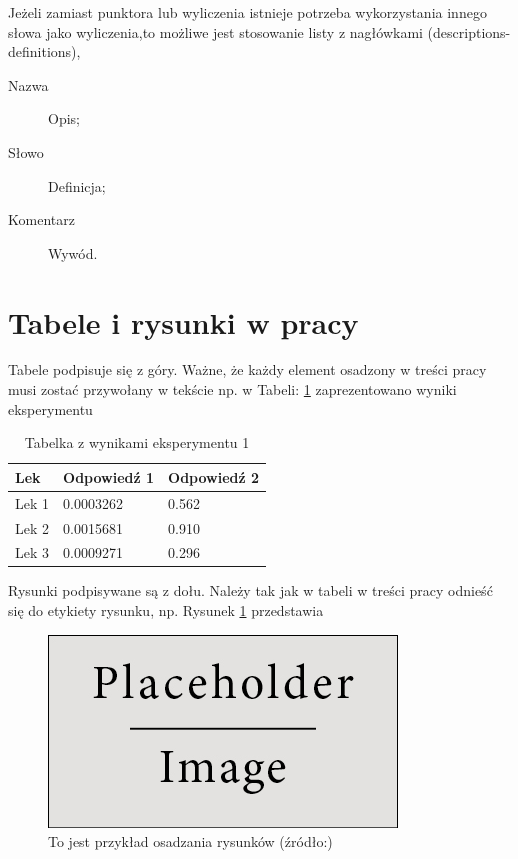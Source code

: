 Jeżeli zamiast punktora lub wyliczenia istnieje potrzeba wykorzystania innego słowa jako wyliczenia,to możliwe jest stosowanie listy z nagłówkami (descriptions-definitions),
\begin{description}
\item[Nazwa] Opis;
\item[Słowo] Definicja;
\item[Komentarz] Wywód.
\end{description}

\section{Tabele i rysunki w pracy}

Tabele podpisuje się z góry. Ważne, że każdy element osadzony w treści pracy musi zostać przywołany w tekście np. w Tabeli: \ref{tab:eksperyment1} zaprezentowano wyniki eksperymentu

\begin{table}[h]
\centering
\caption{Tabelka z wynikami eksperymentu 1} 
\begin{tabular}{l l l}
\toprule
\textbf{Lek} & \textbf{Odpowiedź 1} & \textbf{Odpowiedź 2}\\
\midrule
Lek 1 & 0.0003262 & 0.562 \\
Lek 2 & 0.0015681 & 0.910 \\
Lek 3 & 0.0009271 & 0.296 \\
\bottomrule
\end{tabular}
\label{tab:eksperyment1} %
\end{table}

Rysunki podpisywane są z dołu. Należy tak jak w tabeli w treści pracy odnieść się do etykiety rysunku, np. Rysunek \ref{fig:rys1} przedstawia

\begin{figure}[!ht]
		\centering
		\includegraphics[scale=0.6]{Pictures/placeholder.jpg}
		\caption{To jest przykład osadzania rysunków (źródło:)}
		\label{fig:rys1}
\end{figure}



